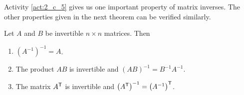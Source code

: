 Activity \ref{act:2_c_5} gives us one important property of matrix inverses. The other properties given in the next theorem can be verified similarly.



\begin{theorem} \label{thm:inverse_properties} Let $A$ and $B$ be invertible $n \times n$ matrices. Then
\begin{enumerate}
\item $\left(A^{-1}\right)^{-1} = A$.
\item The product $AB$ is invertible and  $(AB)^{-1} = B^{-1}A^{-1}$.
\item The matrix $A^{\mathsf{T}}$ is invertible and $\left(A^{\mathsf{T}}\right)^{-1} = \left(A^{-1}\right)^{\mathsf{T}}$.
\end{enumerate}
\end{theorem}

\label{sec:inverse_exam}

\ExampleIntro

